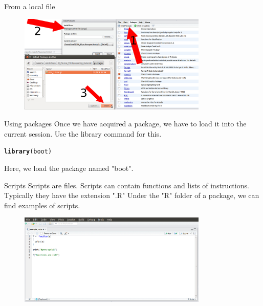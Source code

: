 \documentclass{beamer}\usepackage[]{graphicx}\usepackage[]{color}
\makeatletter
\newcommand{\hlstd}[1]{\textcolor[rgb]{0.345,0.345,0.345}{#1}}%
\newcommand{\hlkwd}[1]{\textcolor[rgb]{0.737,0.353,0.396}{\textbf{#1}}}%
\newenvironment{kframe}{%
 \def\at@end@of@kframe{}%
 \ifinner\ifhmode%
  \def\at@end@of@kframe{\end{minipage}}%
  \begin{minipage}{\columnwidth}%
 \fi\fi%
 \def\FrameCommand##1{\hskip\@totalleftmargin \hskip-\fboxsep
 \colorbox{shadecolor}{##1}\hskip-\fboxsep
     \hskip-\linewidth \hskip-\@totalleftmargin \hskip\columnwidth}%
 \MakeFramed {\advance\hsize-\width
   \@totalleftmargin\z@ \linewidth\hsize
   \@setminipage}}%
 {\par\unskip\endMakeFramed%
 \at@end@of@kframe}
\newenvironment{knitrout}{}{} %
\makeatother
\begin{document}
\begin{frame}[fragile]{From a local file}
\begin{figure}[ht!]
\centering
\includegraphics[width=90mm]{pictures/package_install_local.jpg}
\label{overflow}
\end{figure}

\end{frame}


\begin{frame}[fragile]{Using packages}
Once we have acquired a package, we have to load it into the current session. Use the library command for this.
\begin{knitrout}
\color{fgcolor}\begin{kframe}
\begin{alltt}
\hlkwd{library}\hlstd{(boot)}
\end{alltt}
\end{kframe}
\end{knitrout}

Here, we load the package named "boot".
\end{frame}

\begin{frame}[fragile]{Scripts}
Scripts are files.
\linebreak
Scripts can contain functions and lists of instructions. Typically they have the extension ".R"
\linebreak 
Under the "R" folder of a package, we can find examples of scripts.
\begin{figure}[ht!]
\centering
\includegraphics[width=90mm]{pictures/example_script.jpg}
\label{overflow}
\end{figure}
\end{frame}
\end{document}

